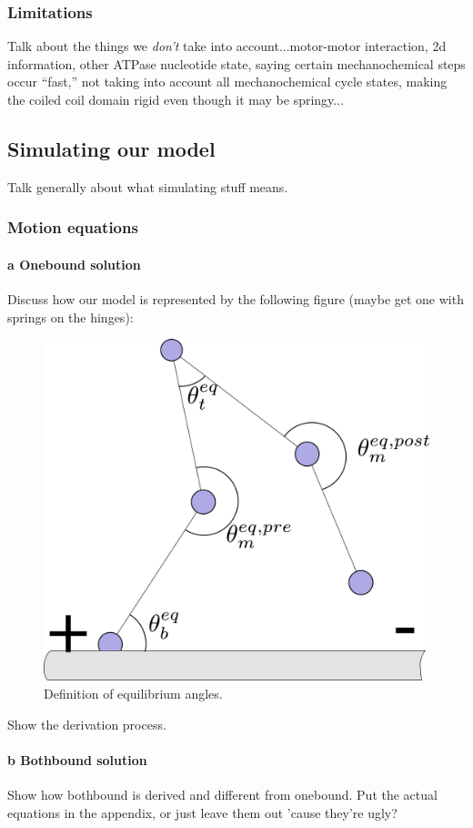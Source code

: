 \documentclass[10pt]{article} %
\begin{document}
\subsubsection{Limitations}
Talk about the things we \textit{don't} take into account...motor-motor interaction, 2d information,
other ATPase nucleotide state, saying certain mechanochemical steps occur ``fast,'' not taking into
account all mechanochemical cycle states, making the coiled coil domain rigid even though it may be
springy...

\subsection{Simulating our model}
Talk generally about what simulating stuff means.\\
\subsubsection{Motion equations}

\paragraph{a Onebound solution}
Discuss how our model is represented by the following figure (maybe get one with springs on the
hinges):\\

\begin{figure}
  \centering
  \includegraphics[width=.45\textwidth]{../figures/equilibrium-onebound}
  \caption{Definition of equilibrium angles.}
  \label{fig:eq_angles}
\end{figure}

Show the derivation process.\\

\paragraph{b Bothbound solution}
Show how bothbound is derived and different from onebound. Put the actual equations in the appendix,
or just leave them out 'cause they're ugly?\\
\end{document}
